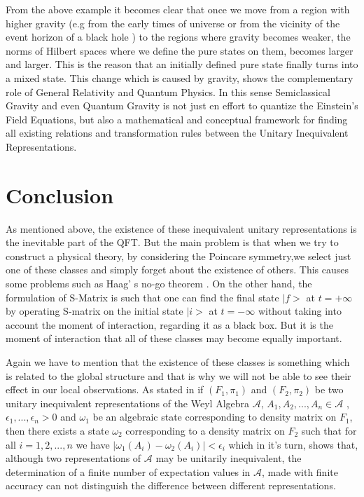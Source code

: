\documentclass[12pt,a4paper]{article}
\begin{document}
From the  above example it becomes clear that once we move from a region with higher gravity (e.g from the early times of universe or from the vicinity of the event horizon of a black hole ) to the regions where gravity becomes weaker, the norms of Hilbert spaces where we define the pure states on them, becomes larger and larger. This is the reason that an initially defined pure state finally turns into a mixed state. This change which is caused by gravity, shows the complementary role of General Relativity and Quantum Physics. In this sense Semiclassical Gravity and even Quantum Gravity is not just en effort to quantize the Einstein's Field Equations, but also a mathematical and conceptual framework for finding all existing relations and transformation rules between the Unitary Inequivalent Representations. 






\section{Conclusion}\label{section.conclusion}
As mentioned above, the existence of these inequivalent unitary representations is the inevitable part of the QFT. But the main problem is that when we try to construct a physical theory, by considering the Poincare symmetry,we select just one of these classes and simply forget about the existence of others. This causes some problems such as Haag' s no-go theorem \cite{HaagArt}. On the other hand, the formulation of S-Matrix is such that one can find the final state $|f>$ at $t=+\infty$ by operating S-matrix on the initial state $|i>$ at $t=-\infty$ without taking into account the moment of interaction, regarding it as a black box. But it is the moment of interaction that all of these classes may become equally important.

Again we have to mention that the existence of these classes is something which is related to the global structure and that is why we will not be able to see their effect  in our local observations. As stated in \cite{Wald} if $(F_1,\pi_1)$ and $ (F_2,\pi_2)$ be two unitary inequivalent representations of the Weyl Algebra $\mathcal{A}$, $A_1,A_2,...,A_n \in \mathcal{A}$ , $\epsilon_1, ... ,\epsilon_n >0$ and $\omega_1$ be an algebraic state corresponding to density matrix on $F_1$, then there exists a state $\omega_2$ corresponding to a density matrix on $F_2$ such that for all $i=1,2,...,n$ we have $|\omega_1(A_i)-\omega_2(A_i)|<\epsilon_i$ which in it's turn, shows that, although two representations of $\mathcal{A}$ may be unitarily inequivalent, the determination of a finite number of expectation values in $\mathcal{A}$, made with finite accuracy can not distinguish the difference between different representations.
\end{document}
